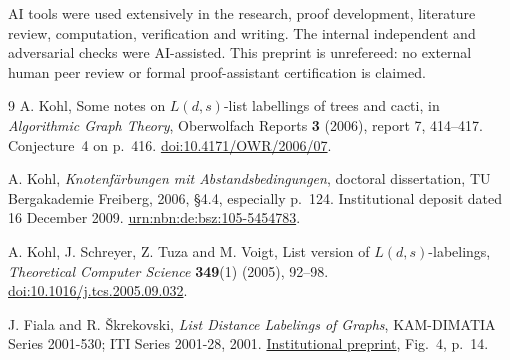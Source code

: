 \documentclass[11pt]{article}
\begin{document}
AI tools were used extensively in the research, proof development,
literature review, computation, verification and writing.
The internal independent and adversarial checks were AI-assisted.
This preprint is unrefereed: no external human peer review or formal
proof-assistant certification is claimed.

\begin{thebibliography}{9}
A. Kohl, Some notes on \(L(d,s)\)-list labellings of trees and cacti,
in \emph{Algorithmic Graph Theory}, Oberwolfach Reports \textbf{3} (2006), report 7,
414--417. Conjecture~4 on p.~416.
\href{https://doi.org/10.4171/OWR/2006/07}{doi:10.4171/OWR/2006/07}.

A. Kohl, \emph{Knotenf\"arbungen mit Abstandsbedingungen},
doctoral dissertation, TU Bergakademie Freiberg, 2006,
\S4.4, especially p.~124. Institutional deposit dated 16 December 2009.
\href{https://nbn-resolving.org/urn:nbn:de:bsz:105-5454783}{urn:nbn:de:bsz:105-5454783}.

A. Kohl, J. Schreyer, Z. Tuza and M. Voigt,
List version of \(L(d,s)\)-labelings,
\emph{Theoretical Computer Science} \textbf{349}(1) (2005), 92--98.
\href{https://doi.org/10.1016/j.tcs.2005.09.032}{doi:10.1016/j.tcs.2005.09.032}.

J. Fiala and R. \v{S}krekovski,
\emph{List Distance Labelings of Graphs},
KAM-DIMATIA Series 2001-530; ITI Series 2001-28, 2001.
\href{https://kam.mff.cuni.cz/kamserie/clanky/2001/s530.pdf}{Institutional preprint},
Fig.~4, p.~14.
\end{thebibliography}
\end{document}
